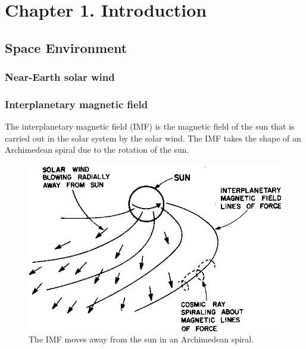 \chapter{Chapter 1. Introduction}

\section{Space Environment}
\subsection{Near-Earth solar wind}
\subsection{Interplanetary magnetic field}
The interplanetary magnetic field (\gls{IMF}) is the magnetic field of the sun that is carried out in the solar system by the solar wind. The IMF takes the shape of an Archimedean spiral due to the rotation of the sun.

\begin{figure}
    \centering
    \includegraphics[width=\linewidth]{Figures/IMF.png}
    \caption{The IMF moves away from the sun in an Archimedean spiral.}
    \label{fig:IMF-spiral}
\end{figure}

